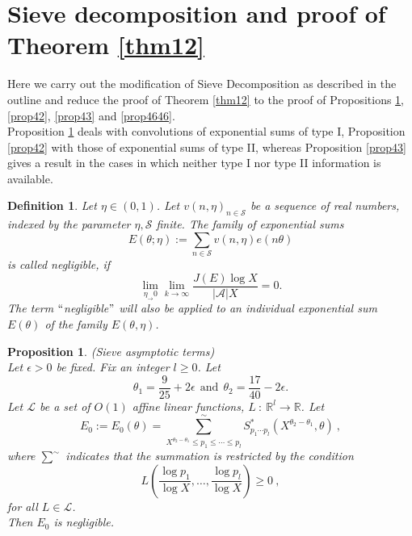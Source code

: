 \documentclass{amsart}
\newtheorem{proposition}[theorem]{Proposition}
\numberwithin{equation}{subsection}
\newtheorem{definition}[theorem]{Definition}
\begin{document}
\section{Sieve decomposition and proof of Theorem \ref{thm12}}

Here we carry out the modification of Sieve Decomposition as described in the outline and reduce the proof of Theorem \ref{thm12} to the proof of Propositions \ref{prop41}, \ref{prop42},  \ref{prop43} and \ref{prop4646}.\\
Proposition \ref{prop41} deals with convolutions of exponential sums of type I, Proposition \ref{prop42} with those of exponential sums of type II, whereas Proposition \ref{prop43} gives a result in the cases in which neither type I nor type II information is available.

\begin{definition}\label{def41}
Let $\eta\in(0,1)$. Let $v(n, \eta)_{n\in\mathcal{S}}$ be a sequence of real numbers, indexed by the parameter $\eta, \mathcal{S}$ finite. The family of exponential sums
$$E(\theta; \eta):=\sum_{n\in\mathcal{S}}v(n, \eta)e(n\theta)$$
is called \textit{negligible}, if 
$$\lim_{\eta_\rightarrow 0}\lim_{k\rightarrow \infty}\frac{J(E)\log X}{|\mathcal{A}|X}=0.$$
The term $``$negligible$"$ will also be applied to an individual exponential sum $E(\theta)$ of the family $E(\theta, \eta)$.
\end{definition}
%
%

\begin{proposition}\label{prop41} (Sieve asymptotic terms)\\
Let $\epsilon>0$ be fixed. Fix an integer $l\geq 0$. Let 
$$\theta_1=\frac{9}{25}+2\epsilon\ \  \text{and}\ \  \theta_2=\frac{17}{40}-2\epsilon.$$
Let $\mathcal{L}$ be a set of $O(1)$ affine linear functions, $L\::\: \mathbb{R}^l\rightarrow \mathbb{R}$. Let
$$E_0:=E_0(\theta)=\sum^{\sim}_{X^{\theta_2-\theta_1}\leq p_1\leq \cdots \leq p_l} S^*_{p_1\cdots p_l}(X^{\theta_2-\theta_1},\theta)\:,$$
where $\sum^{\sim}$ indicates that the summation is restricted by the condition 
$$L\left( \frac{\log p_1}{\log X},\ldots, \frac{\log p_l}{\log X}\right)\geq 0\:,$$
for all $L\in\mathcal{L}$.\\
Then $E_0$ is negligible.
\end{proposition}
\end{document}
